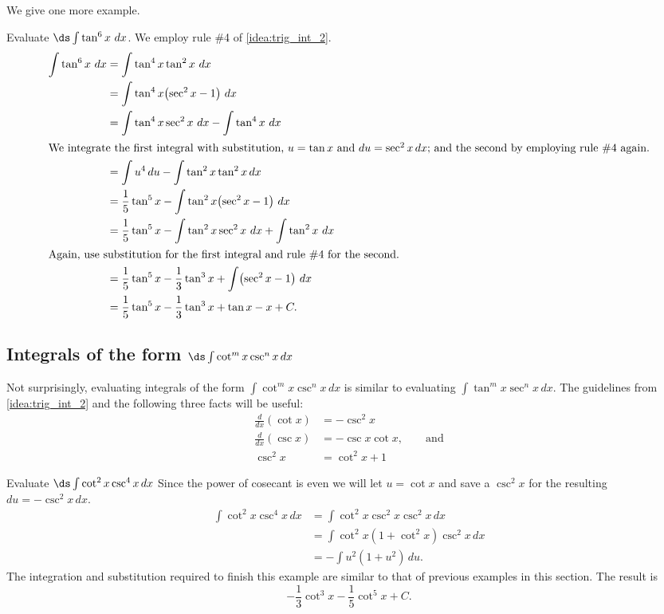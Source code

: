 We give one more example.

\begin{example}\label{ex_trigint7}
Evaluate $\ds\int\tan^6x\ dx$.
\solution
We employ rule \#4 of \autoref{idea:trig_int_2}. 
\begin{align*}
	\int \tan^6x\ dx
	&= \int \tan^4x\tan^2x\ dx \\
	&= \int\tan^4x\bigl(\sec^2x-1\bigr)\ dx\\
	&= \int\tan^4x\sec^2x\ dx - \int\tan^4x\ dx \\
\intertext{We integrate the first integral with substitution, $u=\tan x$ and $du=\sec^2x\,dx$; and the second by employing rule \#4 again.}
	&= \int u^4\, du-\int\tan^2 x\tan^2 x\, dx \\
	&=	\frac15\tan^5x-\int\tan^2x\bigl(\sec^2x-1\bigr)\ dx \\
	&= \frac15\tan^5x -\int\tan^2x\sec^2x\ dx + \int\tan^2x\ dx\\
\intertext{Again, use substitution for the first integral and rule \#4 for the second.}
	&= \frac15\tan^5x-\frac13\tan^3x+\int\bigl(\sec^2x-1\bigr)\ dx \\
	&=	 \frac15\tan^5x-\frac13\tan^3x+\tan x - x+C.
\end{align*}
\end{example}

\subsection{\texorpdfstring{Integrals of the form $\ds\int\cot^mx\csc^nx\,dx$}{Integrands of the form (cot x)\^{}m (csc x)\^{}n}}

Not surprisingly, evaluating integrals of the form $\int\cot^mx\csc^nx\,dx$ is similar to evaluating $\int\tan^mx\sec^nx\,dx$. The guidelines from \autoref{idea:trig_int_2} and the following three facts will be useful:
\begin{align*}
 \frac{d}{dx}(\cot x) &= -\csc^2x \\
 \frac{d}{dx}(\csc x) &= -\csc x\cot x,\qquad\text{and} \\
 \csc^2 x &= \cot^2x+1
\end{align*}

\begin{example}\label{ex_int_cot_csc}
Evaluate $\ds\int\cot^2x\csc^4x\,dx$
\solution
Since the power of cosecant is even we will let $u=\cot x$ and save a $\csc^2x$ for the resulting $du=-\csc^2x\,dx$.
\begin{align*}
 \int\cot^2x\csc^4x\,dx
 &=\int\cot^2x\csc^2x\csc^2x\,dx \\
 &=\int\cot^2x(1+\cot^2x)\csc^2x\,dx \\
 &=-\int u^2(1+u^2)\,du.
\end{align*}
The integration and substitution required to finish this example are similar to that of previous examples in this section. The result is
\[-\frac13\cot^3x-\frac15\cot^5x+C.\]
\end{example}

